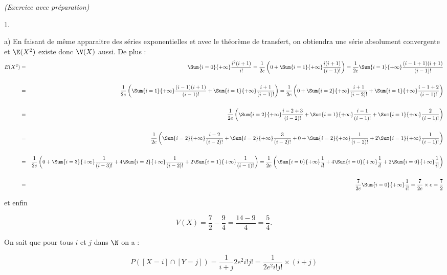 \documentclass[11pt]{article}%
\begin{document}
\begin{exercice}{\it (Exercice avec préparation)}
\begin{noliste}{1.}
\begin{noliste}{a)}
 En faisant de même apparaitre des séries exponentielles et avec le
théorème de transfert, on obtiendra une série absolument convergente et
$\E( X^{2} )$ existe donc $\V( X)$ aussi. De plus : 
 \begin{eqnarray*}
 E ( X^{2} ) & = & \Sum{i = 0}{+ \infty} \frac{ i^{2} (i + 1 ) }{ i! }
= \frac{ 1 }{ 2 e } \left( 0 + \Sum{i = 1}{+ \infty} \frac{ i ( i + 1 )
}{ (i-1)! } \right) = \frac{ 1 }{ 2 e } \Sum{i = 1}{+ \infty} \frac{ (i
- 1 + 1 ) (i + 1) }{ (i-1)! } \\
\\
 & = & \frac{ 1 }{ 2 e } \left( \Sum{i = 1}{+ \infty} \frac{ (i - 1) (i
+ 1) }{ (i-1)! } + \Sum{i = 1}{+ \infty} \frac{i + 1 }{ (i-1)! }
\right) = \frac{ 1 }{ 2 e } \left( 0 + \Sum{i = 2}{+ \infty} \frac{ i +
1 }{ (i-2)! } + \Sum{i = 1}{+ \infty} \frac{ i - 1 + 2 }{ (i-1)! }
\right) \\
\\
 & = & \frac{ 1 }{ 2 e } \left( \Sum{i = 2}{+ \infty} \frac{ i - 2 + 3
}{ (i-2)! } + \Sum{i = 1}{+ \infty} \frac{ i - 1 }{ (i-1)! } + \Sum{i =
1}{+ \infty} \frac{ 2 }{ (i-1)! } \right) \\
\\
 & = & \frac{ 1 }{ 2 e } \left( \Sum{i = 2}{+ \infty} \frac{ i - 2 }{
(i-2)! } + \Sum{i = 2}{+ \infty} \frac{ 3 }{ (i-2)! } + 0 + \Sum{i =
2}{+ \infty} \frac{ 1 }{ (i-2)! } + 2 \Sum{i = 1}{+ \infty} \frac{ 1 }{
(i-1)! } \right) \\
\\
 & = & \frac{ 1 }{ 2 e } \left( 0 + \Sum{i = 3}{+ \infty} \frac{ 1 }{
(i-3)! } + 4 \Sum{i = 2}{+ \infty} \frac{ 1 }{ (i-2)! } + 2 \Sum{i =
1}{+ \infty} \frac{ 1 }{ (i-1)! } \right) = \frac{ 1 }{ 2 e } \left(
\Sum{i = 0}{+ \infty} \frac{ 1 }{ i! } + 4 \Sum{i = 0}{+ \infty} \frac{
1 }{ i! } + 2 \Sum{i = 0}{+ \infty} \frac{ 1 }{ i! } \right) \\
\\
 & = & \frac{ 7 }{ 2 e } \Sum{i = 0}{+ \infty} \frac{ 1 }{ i! } =
\frac{ 7 }{ 2 e } \times e = \frac{ 7 }{ 2 }
 \end{eqnarray*}

 et enfin
 
\[
 V ( X ) = \frac{ 7 }{ 2 } - \frac{ 9 }{ 4 } = \frac{ 14 - 9 }{ 4 } =
\frac{ 5 }{ 4 }. 
\]

 \item On sait que pour tous $i$ et $j$ dans $\N$ on a : 
 
\[
 P ( [X = i] \cap [Y = j] ) = \frac{ 1 }{ i + j }{ 2 e^{2} i! j! } =
\frac{ 1 }{ 2 e^{2} i! j! } \times (i + j) 
\]


\end{noliste}
\end{noliste}
\end{exercice}
\end{document}
